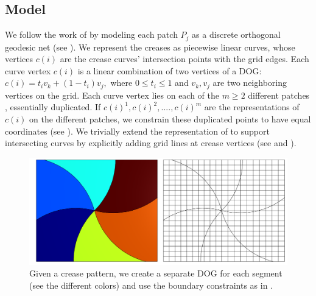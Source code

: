\subsection{Model} \label{sec:model}
We follow the work of \cite{rabi2018shape} by modeling each patch $P_j$ as a discrete orthogonal geodesic net (see ).  We represent the creases as piecewise linear curves, whose vertices $c(i)$ are the crease curves' intersection points with the grid edges. Each curve vertex $c(i)$ is a linear combination of two vertices of a DOG: $c(i) = t_i v_k + (1-t_i)v_j,$ where $0 \leq t_i \leq 1$ and $v_k,v_j$ are two neighboring vertices on the grid.  Each curve vertex lies on each of the $m \geq 2$ different patches , essentially duplicated. If $c(i)^1,c(i)^2,....,c(i)^m$ are the representations of $c(i)$ on the different patches, we constrain these duplicated points to have equal coordinates (see ).
We trivially extend the representation of \cite{rabi2018shape} to support intersecting curves by explicitly adding grid lines at crease vertices (see  and ).

\begin{figure} [h]
	\centering
	\includegraphics[width=0.8\linewidth]{figures/piecewise_dog_from_crease}
	\caption{Given a crease pattern, we create a separate DOG for each segment (see the different colors) and use the boundary constraints as in \cite{rabi2018shape}. }
	\label{fig:piecewise_dog_from_crease}
\end{figure}

